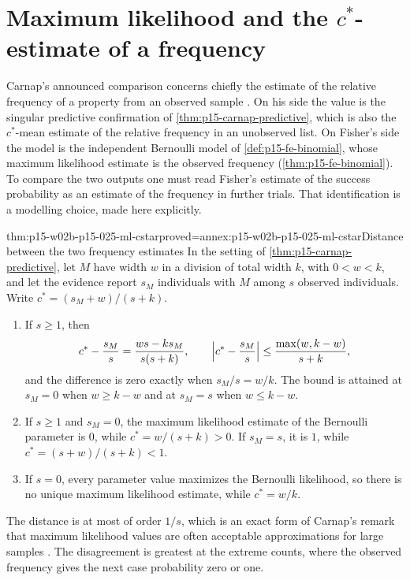 \section{Maximum likelihood and the \texorpdfstring{\(c^*\)}{c*}-estimate of a frequency}
\label{sec:p15-w02b-p15-025-ml}

Carnap's announced comparison concerns chiefly the estimate of the
relative frequency of a property from an observed sample
\cite[sec.~98, p.~520]{Carnap1950Probability}. On his side the value is
the singular predictive confirmation of \cref{thm:p15-carnap-predictive},
which is also the \(c^*\)-mean estimate of the relative frequency in an
unobserved list. On Fisher's side the model is the independent
Bernoulli model of \cref{def:p15-fe-binomial}, whose maximum likelihood
estimate is the observed frequency (\cref{thm:p15-fe-binomial}). To
compare the two outputs one must read Fisher's estimate of the success
probability as an estimate of the frequency in further trials. That
identification is a modelling choice, made here explicitly.

\begin{hbtheorem}{thm:p15-w02b-p15-025-ml-cstar}{proved=annex:p15-w02b-p15-025-ml-cstar}{Distance between the two frequency estimates}
In the setting of \cref{thm:p15-carnap-predictive}, let \(M\) have width
\(w\) in a division of total width \(k\), with \(0<w<k\), and let the
evidence report \(s_M\) individuals with \(M\) among \(s\) observed
individuals. Write \(c^*=(s_M+w)/(s+k)\).
\begin{enumerate}
\item If \(s\ge1\), then
\[
 c^*-\frac{s_M}{s}=\frac{ws-ks_M}{s(s+k)},\qquad
 \Bigl|c^*-\frac{s_M}{s}\Bigr|\le\frac{\max(w,k-w)}{s+k},
\]
and the difference is zero exactly when \(s_M/s=w/k\). The bound is
attained at \(s_M=0\) when \(w\ge k-w\) and at \(s_M=s\) when
\(w\le k-w\).
\item If \(s\ge1\) and \(s_M=0\), the maximum likelihood estimate of the
Bernoulli parameter is \(0\), while \(c^*=w/(s+k)>0\). If \(s_M=s\),
it is \(1\), while \(c^*=(s+w)/(s+k)<1\).
\item If \(s=0\), every parameter value maximizes the Bernoulli
likelihood, so there is no unique maximum likelihood estimate, while
\(c^*=w/k\).
\end{enumerate}
\end{hbtheorem}

The distance is at most of order \(1/s\), which is an exact form of
Carnap's remark that maximum likelihood values are often acceptable
approximations for large samples \cite[sec.~98, p.~515]{Carnap1950Probability}.
The disagreement is greatest at the extreme counts, where the observed
frequency gives the next case probability zero or one.

